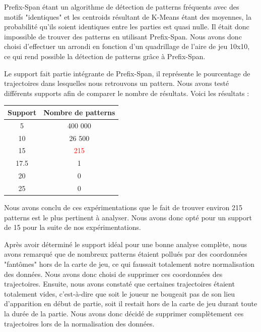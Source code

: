\documentclass{article}
\begin{document}
            Prefix-Span étant un algorithme de détection de patterns fréquents avec des motifs "identiques" et les centroids résultant de K-Means étant des moyennes, la probabilité qu’ils soient identiques entre les parties est quasi nulle. Il était donc impossible de trouver des patterns en utilisant Prefix-Span. Nous avons donc choisi d’effectuer un arrondi en fonction d’un quadrillage de l’aire de jeu 10x10, ce qui rend possible la détection de patterns grâce à Prefix-Span.

            Le support fait partie intégrante de Prefix-Span, il représente le pourcentage de trajectoires dans lesquelles nous retrouvons un pattern. Nous avons testé différents supports afin de comparer le nombre de résultats.
            Voici les résultats :
             \begin{center}
                    \begin{tabular}{|c|c|}
                        \hline
                        Support & Nombre de patterns \\
                        \hline
                        5 & 400 000 \\
                        \hline
                        10 & 26 500 \\
                        \hline
                        15 & \textcolor{red}{215} \\
                        \hline
                        17.5 & 1 \\
                        \hline
                        20 & 0 \\
                        \hline
                        25 & 0 \\
                        \hline
                    \end{tabular}
                \end{center}
            Nous avons conclu de ces expérimentations que le fait de trouver environ 215 patterns est le plus pertinent à analyser. Nous avons donc opté pour un support de 15 pour la suite de nos expérimentations.
            

            Après avoir déterminé le support idéal pour une bonne analyse complète, nous avons remarqué que de nombreux patterns étaient pollués par des coordonnées "fantômes" hors de la carte de jeu, ce qui faussait totalement notre normalisation des données. Nous avons donc choisi de supprimer ces coordonnées des trajectoires.
            Ensuite, nous avons constaté que certaines trajectoires étaient totalement vides, c’est-à-dire que soit le joueur ne bougeait pas de son lieu d’apparition en début de partie, soit il restait hors de la carte de jeu durant toute la durée de la partie. Nous avons donc décidé de supprimer complètement ces trajectoires lors de la normalisation des données.
            
\end{document}
